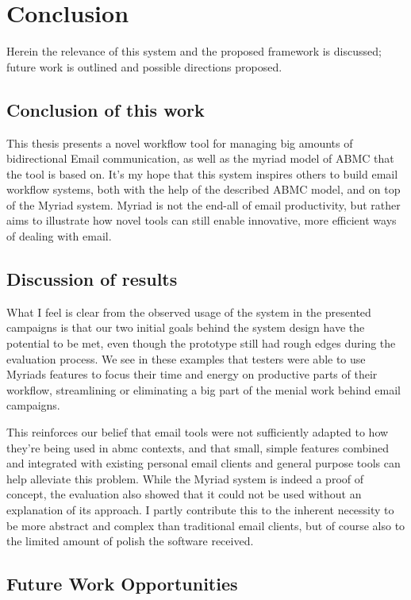 \chapter{Conclusion}
\label{chapter:Conclusion}

Herein the relevance of this system and the proposed framework is discussed; future work is outlined and possible directions proposed.

\section{Conclusion of this work}

This thesis presents a novel workflow tool for managing big amounts of bidirectional Email communication, as well as the myriad model of ABMC that the tool is based on.
It’s my hope that this system inspires others to build email workflow systems, both with the help of the described ABMC model, and on top of the Myriad system. Myriad is not the end-all of email productivity, but rather aims to illustrate how novel tools can still enable innovative, more efficient ways of dealing with email.

\section{Discussion of results}

What I feel is clear from the observed usage of the system in the presented campaigns is that our two initial goals behind the system design have the potential to be met, even though the prototype still had rough edges during the evaluation process. We see in these examples that testers were able to use Myriads features to focus their time and energy on productive parts of their workflow, streamlining or eliminating a big part of the menial work behind email campaigns.

This reinforces our belief that email tools were not sufficiently adapted to how they’re being used in \gls{abmc} contexts, and that small, simple features combined and integrated with existing personal email clients and general purpose tools can help alleviate this problem.
While the Myriad system is indeed a proof of concept, the evaluation also showed that it could not be used without an explanation of its approach. I partly contribute this to the inherent necessity to be more abstract and complex than traditional email clients, but of course also to the limited amount of polish the software received.

\section{Future Work Opportunities}

